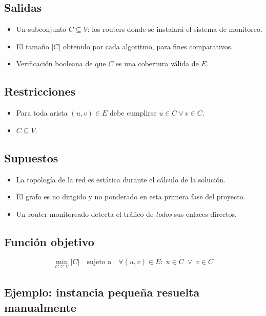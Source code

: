 \documentclass[11pt,a4paper]{article}
\begin{document}
\subsection{Salidas}
\begin{itemize}
	\item Un subconjunto $C \subseteq V$: los routers donde se instalará el sistema de
	monitoreo.
	\item El tamaño $|C|$ obtenido por cada algoritmo, para fines comparativos.
	\item Verificación booleana de que $C$ es una cobertura válida de $E$.
\end{itemize}

\subsection{Restricciones}
\begin{itemize}
	\item Para toda arista $(u,v) \in E$ debe cumplirse $u \in C \lor v \in C$.
	\item $C \subseteq V$.
\end{itemize}

\subsection{Supuestos}
\begin{itemize}
	\item La topología de la red es estática durante el cálculo de la solución.
	\item El grafo es no dirigido y no ponderado en esta primera fase del proyecto.
	\item Un router monitoreado detecta el tráfico de \emph{todos} sus enlaces directos.
\end{itemize}

\subsection{Función objetivo}
\begin{equation}
	\min_{C \subseteq V} |C|
	\quad \text{sujeto a} \quad
	\forall (u,v) \in E: \; u \in C \; \lor \; v \in C
\end{equation}

\subsection{Ejemplo: instancia pequeña resuelta manualmente}
\label{sec:ejemplo-manual}
\end{document}
